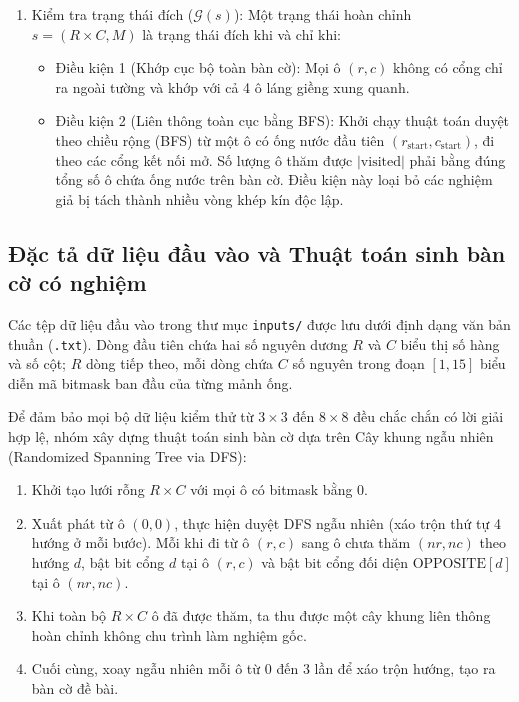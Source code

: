 \documentclass[a4paper]{article}
\begin{document}
\begin{enumerate}
    \item Kiểm tra trạng thái đích ($\mathcal{G}(s)$):
    Một trạng thái hoàn chỉnh $s = (R \times C, M)$ là trạng thái đích khi và chỉ khi:
    \begin{itemize}
        \item Điều kiện 1 (Khớp cục bộ toàn bàn cờ): Mọi ô $(r, c)$ không có cổng chỉ ra ngoài tường và khớp với cả 4 ô láng giềng xung quanh.
        \item Điều kiện 2 (Liên thông toàn cục bằng BFS): Khởi chạy thuật toán duyệt theo chiều rộng (BFS) từ một ô có ống nước đầu tiên $(r_{\text{start}}, c_{\text{start}})$, đi theo các cổng kết nối mở. Số lượng ô thăm được $|\text{visited}|$ phải bằng đúng tổng số ô chứa ống nước trên bàn cờ. Điều kiện này loại bỏ các nghiệm giả bị tách thành nhiều vòng khép kín độc lập.
    \end{itemize}
\end{enumerate}

\subsection{Đặc tả dữ liệu đầu vào và Thuật toán sinh bàn cờ có nghiệm}
Các tệp dữ liệu đầu vào trong thư mục \texttt{inputs/} được lưu dưới định dạng văn bản thuần (\texttt{.txt}). Dòng đầu tiên chứa hai số nguyên dương $R$ và $C$ biểu thị số hàng và số cột; $R$ dòng tiếp theo, mỗi dòng chứa $C$ số nguyên trong đoạn $[1, 15]$ biểu diễn mã bitmask ban đầu của từng mảnh ống.

Để đảm bảo mọi bộ dữ liệu kiểm thử từ $3 \times 3$ đến $8 \times 8$ đều chắc chắn có lời giải hợp lệ, nhóm xây dựng thuật toán sinh bàn cờ dựa trên Cây khung ngẫu nhiên (Randomized Spanning Tree via DFS):
\begin{enumerate}
    \item Khởi tạo lưới rỗng $R \times C$ với mọi ô có bitmask bằng $0$.
    \item Xuất phát từ ô $(0, 0)$, thực hiện duyệt DFS ngẫu nhiên (xáo trộn thứ tự 4 hướng ở mỗi bước). Mỗi khi đi từ ô $(r, c)$ sang ô chưa thăm $(nr, nc)$ theo hướng $d$, bật bit cổng $d$ tại ô $(r, c)$ và bật bit cổng đối diện $\text{OPPOSITE}[d]$ tại ô $(nr, nc)$.
    \item Khi toàn bộ $R \times C$ ô đã được thăm, ta thu được một cây khung liên thông hoàn chỉnh không chu trình làm nghiệm gốc.
    \item Cuối cùng, xoay ngẫu nhiên mỗi ô từ $0$ đến $3$ lần để xáo trộn hướng, tạo ra bàn cờ đề bài.
\end{enumerate}
\end{document}
